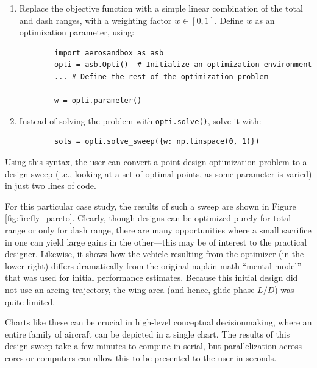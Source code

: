 \begin{enumerate}[noitemsep]
    \item Replace the objective function with a simple linear combination of the total and dash ranges, with a weighting factor $w \in [0, 1]$. Define $w$ as an optimization parameter, using:
    \begin{verbatim}
        import aerosandbox as asb
        opti = asb.Opti()  # Initialize an optimization environment
        ... # Define the rest of the optimization problem

        w = opti.parameter()
    \end{verbatim}

    \item Instead of solving the problem with \texttt{opti.solve()}, solve it with:

    \begin{verbatim}
        sols = opti.solve_sweep({w: np.linspace(0, 1)})
    \end{verbatim}

\end{enumerate}

Using this syntax, the user can convert a point design optimization problem to a design sweep (i.e., looking at a set of optimal points, as some parameter is varied) in just two lines of code.

For this particular case study, the results of such a sweep are shown in Figure \ref{fig:firefly_pareto}. Clearly, though designs can be optimized purely for total range or only for dash range, there are many opportunities where a small sacrifice in one can yield large gains in the other—this may be of interest to the practical designer. Likewise, it shows how the vehicle resulting from the optimizer (in the lower-right) differs dramatically from the original napkin-math ``mental model'' that was used for initial performance estimates. Because this initial design did not use an arcing trajectory, the wing area (and hence, glide-phase $L/D$) was quite limited.

Charts like these can be crucial in high-level conceptual decisionmaking, where an entire family of aircraft can be depicted in a single chart. The results of this design sweep take a few minutes to compute in serial, but parallelization across cores or computers can allow this to be presented to the user in seconds.

